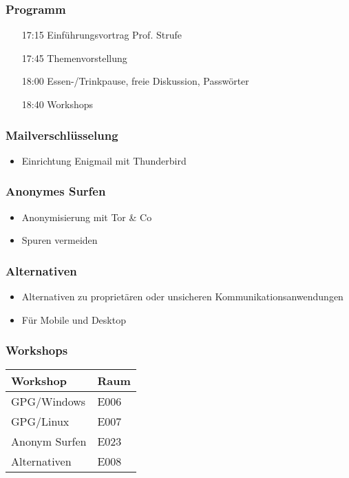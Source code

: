 \documentclass[a4]{beamer}
\begin{document}
\begin{frame}
  \frametitle{Programm}
  \begin{itemize}
  \item[17:15] Einführungsvortrag Prof. Strufe
  \item[17:45] Themenvorstellung
  \item[18:00] Essen-/Trinkpause, freie Diskussion, Passwörter
  \item[18:40] Workshops
  \end{itemize}
\end{frame}

\begin{frame}
  \frametitle{Mailverschlüsselung}
  \begin{itemize}
  \item Einrichtung Enigmail mit Thunderbird
  \end{itemize}
\end{frame}

\begin{frame}
  \frametitle{Anonymes Surfen}
  \begin{itemize}
  \item Anonymisierung mit Tor \& Co
  \item Spuren vermeiden
  \end{itemize}
\end{frame}

\begin{frame}
  \frametitle{Alternativen}
  \begin{itemize}
  \item Alternativen zu proprietären oder unsicheren Kommunikationsanwendungen
  \item Für Mobile und Desktop
  \end{itemize}
\end{frame}

\begin{frame}
  \frametitle{Workshops}
  \begin{tabu}{Xl}
    \toprule
    Workshop & Raum \\
    \midrule
    GPG/Windows & E006 \\
    GPG/Linux & E007 \\
    Anonym Surfen & E023\\
    Alternativen & E008 \\
    \bottomrule
  \end{tabu}
\end{frame}
\end{document}
